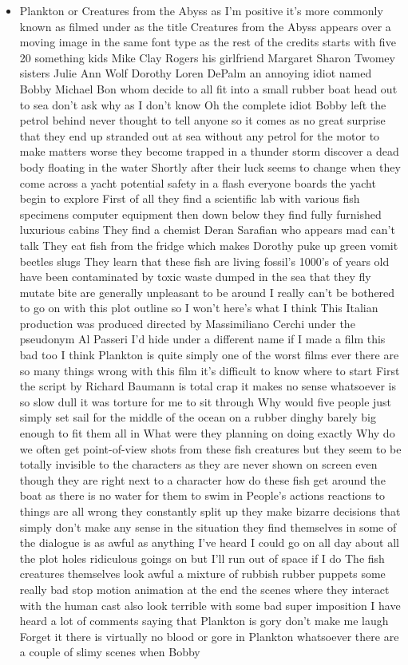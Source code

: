 \documentclass{article}
\begin{document}
\begin{itemize}
\begin{itemize}
		\item Plankton  or Creatures from the Abyss as I'm positive it's more commonly known as   filmed under as the title Creatures from the Abyss appears over a moving image   in the same font type as the rest of the credits  starts with five 20 something kids  Mike  Clay Rogers  his girlfriend Margaret  Sharon Twomey   sisters Julie  Ann Wolf    Dorothy  Loren DePalm    an annoying idiot named Bobby  Michael Bon  whom decide to all fit into a small rubber boat   head out to sea  don't ask why as I don't know  Oh   the complete idiot Bobby left the petrol behind   never thought to tell anyone so it comes as no great surprise that they end up stranded out at sea without any petrol for the motor   to make matters worse they become trapped in a thunder storm   discover a dead body floating in the water  Shortly after their luck seems to change when they come across a yacht   potential safety  in a flash everyone boards the yacht   begin to explore  First of all they find a scientific lab with various fish specimens   computer equipment  then down below they find fully furnished   luxurious cabins  They find a chemist  Deran Sarafian  who appears mad   can't talk  They eat fish from the fridge which makes Dorothy puke up green vomit  beetles   slugs  They learn that these fish are living fossil's 1000's of years old   have been contaminated by toxic waste dumped in the sea   that they fly  mutate  bite   are generally unpleasant to be around  I really can't be bothered to go on with this plot outline so I won't  here's what I think    This Italian production was produced   directed by Massimiliano Cerchi under the pseudonym Al Passeri  I'd hide under a different name if I made a film this bad too    I think Plankton is quite simply one of the worst films ever  there are so many things wrong with this film it's difficult to know where to start  First the script by Richard Baumann is total crap  it makes no sense whatsoever   is so slow   dull it was torture for me to sit through  Why would five people just simply set sail for the middle of the ocean on a rubber dinghy barely big enough to fit them all in  What were they planning on doing exactly  Why do we often get point-of-view shots from these fish creatures but they seem to be totally invisible to the characters as they are never shown on screen even though they are right next to a character    how do these fish get around the boat as there is no water for them to swim in  People's actions   reactions to things are all wrong  they constantly split up  they make bizarre decisions that simply don't make any sense in the situation they find themselves in   some of the dialogue is as awful as anything I've heard  I could go on all day about all the plot holes   ridiculous goings on but I'll run out of space if I do  The fish creatures themselves look awful  a mixture of rubbish rubber puppets   some really bad stop motion animation at the end  the scenes where they interact with the human cast also look terrible with some bad super imposition  I have heard a lot of comments saying that Plankton is gory  don't make me laugh  Forget it there is virtually no blood or gore in Plankton whatsoever  there are a couple of slimy scenes when Bobby 
\end{itemize}
\end{itemize}
\end{document}
